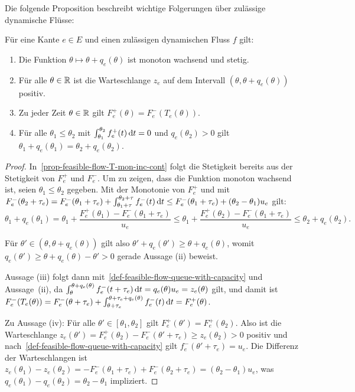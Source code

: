 Die folgende Proposition beschreibt wichtige Folgerungen über zulässige dynamische Flüsse:

\begin{proposition}\label{prop-feasible-flow}
	Für eine Kante $e\in E$ und einen zulässigen dynamischen Fluss $f$ gilt:
	\begin{enumerate}[label=(\roman*)]
		\item\label{prop-feasible-flow-T-mon-inc-cont} Die Funktion $\theta \mapsto \theta + q_e(\theta)$ ist monoton wachsend und stetig.
		\item\label{prop-feasible-flow-positive-queue} Für alle $\theta\in\mathbb{R}$ ist die Warteschlange $z_e$ auf dem Intervall $(\theta, \theta + q_e(\theta))$ positiv.
		\item\label{prop-feasible-flow-det-outflow} Zu jeder Zeit $\theta\in\mathbb{R}$ gilt $F_e^+(\theta) = F_e^-(T_e(\theta))$.
		\item\label{prop-feasible-flow-queue-delay} Für alle $\theta_1 \leq \theta_2$ mit $\int_{\theta_1}^{\theta_2} f^+_e(t) \mathop{}\!\mathrm{d} t = 0$ und $q_e(\theta_2)>0$ gilt $\theta_1 + q_e(\theta_1) = \theta_2 + q_e(\theta_2)$.
	\end{enumerate}
\end{proposition}
\begin{proof}
	In~\ref{prop-feasible-flow-T-mon-inc-cont} folgt die Stetigkeit bereits aus der Stetigkeit von $F_e^+$ und $F_e^-$.
	Um zu zeigen, dass die Funktion monoton wachsend ist, seien $\theta_1 \leq \theta_2$ gegeben.
	Mit der Monotonie von $F_e^+$ und mit $F_e^-(\theta_2 + \tau_e) = F_e^-(\theta_1+\tau_e) + \int_{\theta_1+\tau}^{\theta_2+\tau} f_e^-(t)\mathop{}\!\mathrm{d} t\leq F_e^-(\theta_1 + \tau_e) + (\theta_2 - \theta_1)u_e$ gilt: 
	\[
		\theta_1 + q_e(\theta_1)
		= \theta_1 + \frac{F_e^+(\theta_1) - F_e^-(\theta_1 + \tau_e)}{u_e}
		\leq \theta_1 + \frac{F_e^+(\theta_2) - F_e^-(\theta_1+\tau_e)}{u_e} \leq \theta_2 + q_e(\theta_2).
	\]
	
	Für $\theta'\in (\theta, \theta+q_e(\theta))$ gilt also $\theta' + q_e(\theta') \geq \theta + q_e(\theta)$, womit $q_e(\theta') \geq \theta + q_e(\theta) - \theta' > 0$ gerade Aussage (ii) beweist.
	
	Aussage (iii) folgt dann mit~\ref{def-feasible-flow-queue-with-capacity} und Aussage~(ii), da
	$\int_{\theta}^{\theta + q_e(\theta)}f_e^-(t + \tau_e) \mathop{}\!\mathrm{d} t = q_e(\theta)  u_e = z_e(\theta)$ gilt, und damit ist $F_e^-(T_e(\theta)) = F_e^-(\theta+\tau_e) + \int_{\theta+\tau_e}^{\theta+\tau_e+q_e(\theta)}f_e^-(t)\mathop{}\!\mathrm{d} t = F_e^+(\theta)$.
	
	Zu Aussage (iv):
	Für alle $\theta'\in [\theta_1, \theta_2]$ gilt $F_e^+(\theta') = F_e^+(\theta_2)$.
	Also ist die Warteschlange $z_e(\theta') = F_e^+(\theta_2) - F_e^-(\theta' + \tau_e) \geq z_e(\theta_2) > 0$ positiv und nach~\ref{def-feasible-flow-queue-with-capacity} gilt $f_e^-(\theta' + \tau_e)=u_e$.
	Die Differenz der Warteschlangen ist
	$z_e(\theta_1)-z_e(\theta_2)=-F^-_e(\theta_1 + \tau_e) + F^-_e(\theta_2 + \tau_e) = (\theta_2 - \theta_1)u_e$, was $q_e(\theta_1) - q_e(\theta_2) = \theta_2 - \theta_1$ impliziert.
\end{proof}